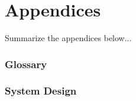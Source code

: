 
\part*{Appendices}

Summarize the appendices below...

\appendix


\toclineskip
\section{Glossary}


\toclineskip
\section{System Design}



